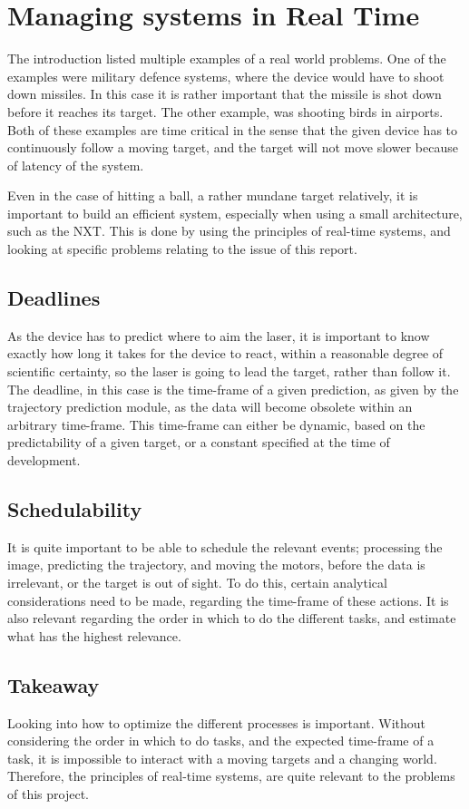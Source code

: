 
\section{Managing systems in Real Time} 
The introduction listed multiple examples of a real world problems.
One of the examples were military defence systems, where the device would have to shoot down missiles.
In this case it is rather important that the missile is shot down before it reaches its target.
The other example, was shooting birds in airports.
Both of these examples are time critical in the sense that the given device has to continuously follow a moving target, and the target will not move slower because of latency of the system.

Even in the case of hitting a ball, a rather mundane target relatively, it is important to build an efficient system, especially when using a small architecture, such as the NXT.
This is done by using the principles of real-time systems, and looking at specific problems relating to the issue of this report.

\subsection{Deadlines}
As the device has to predict where to aim the laser, it is important to know exactly how long it takes for the device to react, within a reasonable degree of scientific certainty, so the laser is going to lead the target, rather than follow it. 
The deadline, in this case is the time-frame of a given prediction, as given by the trajectory prediction module, as the data will become obsolete within an arbitrary time-frame.
This time-frame can either be dynamic, based on the predictability of a given target, or a constant specified at the time of development.

\subsection{Schedulability}
It is quite important to be able to schedule the relevant events; processing the image, predicting the trajectory, and moving the motors, before the data is irrelevant, or the target is out of sight.
To do this, certain analytical considerations need to be made, regarding the time-frame of these actions. 
It is also relevant regarding the order in which to do the different tasks, and estimate what has the highest relevance.

\subsection{Takeaway}
Looking into how to optimize the different processes is important.
Without considering the order in which to do tasks, and the expected time-frame of a task, it is impossible to interact with a moving targets and a changing world. 
Therefore, the principles of real-time systems, are quite relevant to the problems of this project.

